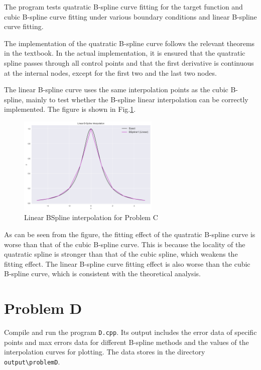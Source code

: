 \documentclass[a4paper]{article}
\begin{document}
\begin{sloppypar}
The program tests quatratic B-spline curve fitting for the target function and
cubic B-spline curve fitting under various boundary conditions and linear
B-spline curve fitting.

The implementation of the quatratic B-spline curve follows the relevant
theorems in the textbook. In the actual implementation, it is ensured that the
quatratic spline passes through all control points and that the first
derivative is continuous at the internal nodes, except for the first two and
the last two nodes.

The linear B-spline curve uses the same interpolation points as the cubic
B-spline, mainly to test whether the B-spline linear interpolation can be
correctly implemented. The figure is shown in
Fig.\ref{fig:Linear_BSpline_interpolation_C}.

\begin{figure}[H]
  \centering
  \includegraphics[width=0.6\textwidth]{../figure/problemC/Linear_BSpline_interpolation.png}
  \renewcommand{\figurename}{Fig.}
  \caption{Linear BSpline interpolation for Problem C}
  \label{fig:Linear_BSpline_interpolation_C}
\end{figure}

As can be seen from the figure, the fitting effect of the quatratic B-spline
curve is worse than that of the cubic B-spline curve. This is because the
locality of the quatratic spline is stronger than that of the cubic spline,
which weakens the fitting effect. The linear B-spline curve fitting effect is
also worse than the cubic B-spline curve, which is consistent with the
theoretical analysis.

\section*{Problem D}
Compile and run the program \verb|D.cpp|. Its output includes the error data of specific points and max errors data for different B-spline methods and the values of the interpolation curves for plotting. The data stores in the directory \verb|output\problemD|.


\end{sloppypar}
\end{document}
